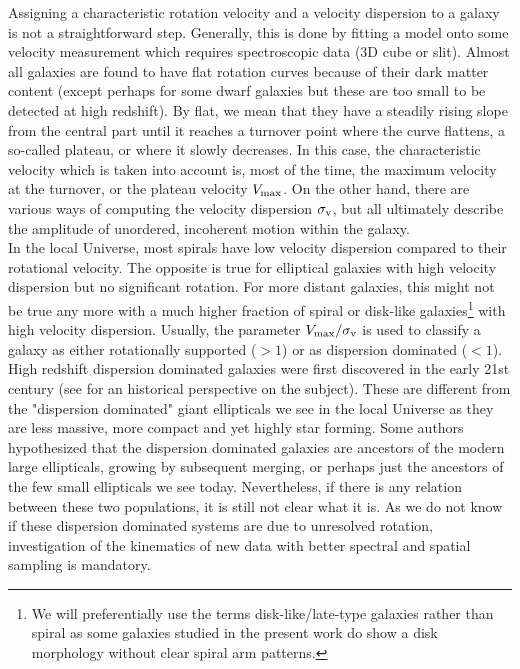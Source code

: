 Assigning a characteristic rotation velocity and a velocity dispersion to a galaxy is not a straightforward step. Generally, this is done by fitting a model onto some velocity measurement which requires spectroscopic data (3D cube or slit). Almost all galaxies are found to have flat rotation curves because of their dark matter content (except perhaps for some dwarf galaxies but these are too small to be detected at high redshift). By flat, we mean that they have a steadily rising slope from the central part until it reaches a turnover point where the curve flattens, a so-called plateau, or where it slowly decreases. In this case, the characteristic velocity which is taken into account is, most of the time, the maximum velocity at the turnover, or the plateau velocity $V_{\rm{max}}$. On the other hand, there are various ways of computing the velocity dispersion $\sigma_{\rm{v}}$, but all ultimately describe the amplitude of unordered, incoherent motion within the galaxy.\\

In the local Universe, most spirals have low velocity dispersion compared to their rotational velocity. The opposite is true for elliptical galaxies with high velocity dispersion but no significant rotation. For more distant galaxies, this might not be true any more with a much higher fraction of spiral or disk-like galaxies\footnote{We will preferentially use the terms disk-like/late-type galaxies rather than spiral as some galaxies studied in the present work do show a disk morphology without clear spiral arm patterns.} with high velocity dispersion. Usually, the parameter $V_{\rm{max}} / \sigma_{\rm{v}}$ is used to classify a galaxy as either rotationally supported ($> 1$) or as dispersion dominated ($< 1$). High redshift dispersion dominated galaxies were first discovered in the early 21st century (see  for an historical perspective on the subject). These are different from the "dispersion dominated" giant ellipticals we see in the local Universe as they are less massive, more compact and yet highly star forming. Some authors hypothesized that the dispersion dominated galaxies are ancestors of the modern large ellipticals, growing by subsequent merging, or perhaps just the ancestors of the few small ellipticals we see today. Nevertheless, if there is any relation between these two populations, it is still not clear what it is. As we do not know if these dispersion dominated systems are due to unresolved rotation, investigation of the kinematics of new data with better spectral and spatial sampling is mandatory.\\

